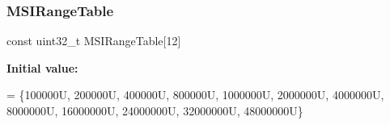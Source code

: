 \subsubsection{\texorpdfstring{M\+S\+I\+Range\+Table}{MSIRangeTable}}
{\footnotesize\ttfamily const uint32\+\_\+t M\+S\+I\+Range\+Table\mbox{[}12\mbox{]}}

{\bfseries Initial value\+:}
\begin{DoxyCode}
= \{100000U,   200000U,   400000U,   800000U,  1000000U,  2000000U, 
                                      4000000U, 8000000U, 16000000U, 24000000U, 32000000U, 48000000U\}
\end{DoxyCode}
